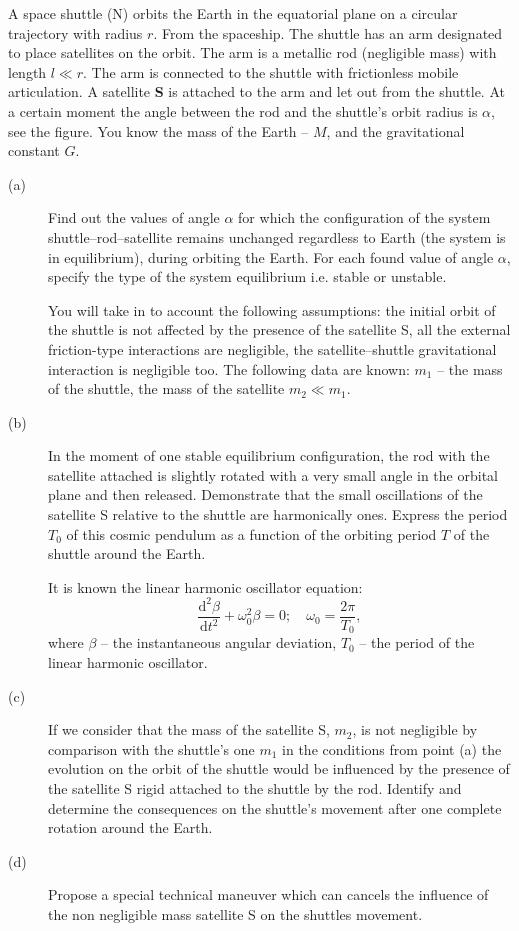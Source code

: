 A space shuttle (N) orbits the Earth in the equatorial plane on a circular
trajectory with radius $r$. From the spaceship. The shuttle has an arm
designated to place satellites on the orbit. The arm is a metallic rod
(negligible mass) with length $l \ll r$. The arm is connected to the shuttle
with frictionless mobile articulation. A satellite \textbf{S} is attached to
the arm and let out from the shuttle. At a certain moment the angle between the
rod and the shuttle's orbit radius is $\alpha$, see the figure. You know the
mass of the Earth -- $M$, and the gravitational constant $G$.


\begin{description}
\item[(a)] Find out the values of angle $\alpha$ for which the configuration
  of the system shuttle--rod--satellite remains unchanged regardless to Earth
  (the system is in equilibrium), during orbiting the Earth. For each found
  value of angle $\alpha$, specify the type of the system equilibrium i.e.
  stable or unstable.

  You will take in to account the following assumptions: the initial orbit of
  the shuttle is not affected by the presence of the satellite S, all the
  external friction-type interactions are negligible, the satellite--shuttle
  gravitational interaction is negligible too. The following data are known:
  $m_1$ -- the mass of the shuttle, the mass of the satellite $m_2 \ll m_1$.
\item[(b)] In the moment of one stable equilibrium configuration, the rod with
  the satellite attached is slightly rotated with a very small angle in the
  orbital plane and then released. Demonstrate that the small oscillations of
  the satellite S relative to the shuttle are harmonically ones. Express the
  period $T_0$ of this cosmic pendulum as a function of the orbiting period $T$
  of the shuttle around the Earth.

  It is known the linear harmonic oscillator equation:
  \[ \frac{\mathrm{d}^2 \beta}{\mathrm{d}t^2} + \omega_0^2 \beta = 0; \quad
     \omega_0 = \frac{2\pi}{T_0}, \]
  where $\beta$ -- the instantaneous angular deviation, $T_0$ -- the period of
  the linear harmonic oscillator.
\item[(c)] If we consider that the mass of the satellite S, $m_2$, is not
  negligible by comparison with the shuttle's one $m_1$ in the conditions from
  point (a) the evolution on the orbit of the shuttle would be influenced by
  the presence of the satellite S rigid attached to the shuttle by the rod.
  Identify and determine the consequences on the shuttle's movement after one
  complete rotation around the Earth.
\item[(d)] Propose a special technical maneuver which can cancels the
  influence of the non negligible mass satellite S on the shuttles movement.
\end{description}

